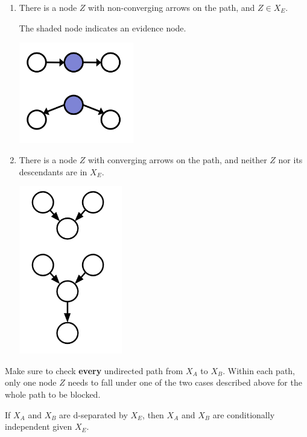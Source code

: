 \documentclass[11pt,letterpaper]{article}
\begin{document}
\begin{enumerate}
\item There is a node $Z$ with non-converging arrows on the path, and $Z \in X_E$.

The shaded node indicates an evidence node.

\includegraphics[width=5cm]{block_nonconverge}

\item There is a node $Z$ with converging arrows on the path, and neither $Z$ nor its descendants are in $X_E$.

\includegraphics[width=4.5cm]{block_converging_3}
\end{enumerate}

Make sure to check \textbf{every} undirected path from $X_A$ to $X_B$. Within each path, only one node $Z$ needs to fall under one of the two cases described above for the whole path to be blocked.

If $X_A$ and $X_B$ are d-separated by $X_E$, then $X_A$ and $X_B$ are conditionally independent given $X_E$.
\newpage
\end{document}
